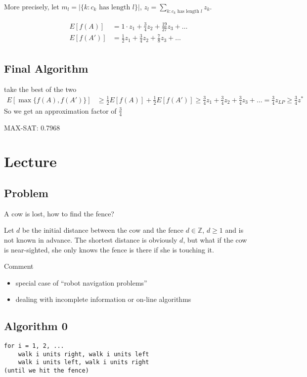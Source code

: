 \documentclass[english,12pt]{article}
\theoremstyle{plain}
\theoremstyle{definition}
\theoremstyle{definition} %
\begin{document}
More precisely, let $m_l=|\{k: c_k\text{ has length }l\}|$, $z_l = \sum_{k:c_k\text{ has length }l} z_k$.

\begin{align*}
E\left[f(A)\right] &= 1\cdot z_1 + \frac{3}{4}z_2+\frac{19}{27}z_3+\ldots\\
E\left[f(A')\right] &= \frac{1}{2}z_1 + \frac{3}{4}z_2+\frac{7}{8}z_3+\ldots\\
\end{align*}

\subsection{Final Algorithm}
take the best of the two
\begin{align*}
E\left[\max\{f(A), f(A')\}\right] &\ge \frac{1}{2}E\left[f(A)\right] + \frac{1}{2}E\left[f(A')\right]
\ge \frac{3}{4}z_1 + \frac{3}{4}z_2+\frac{3}{4}z_3+\ldots
=\frac{3}{4}z_{LP}
\ge \frac{3}{4}z^\ast
\end{align*}
So we get an approximation factor of $\frac{3}{4}$

MAX-SAT: 0.7968

\section{Lecture}
\subsection{Problem}
A cow is lost, how to find the fence?

Let $d$ be the initial distance between the cow and the fence $d\in\mathbb{Z}$, $d\ge 1$ and is not known in advance.  The shortest distance is obviously $d$, but what if the cow is near-sighted, she only knows the fence is there if she is touching it.

Comment 
\begin{itemize}
\item special case of ``robot navigation problems''
\item dealing with incomplete information or on-line algorithms 
\end{itemize}

\subsection{Algorithm 0}
\begin{verbatim}
for i = 1, 2, ...
    walk i units right, walk i units left
    walk i units left, walk i units right
(until we hit the fence)
\end{verbatim}
\end{document}
